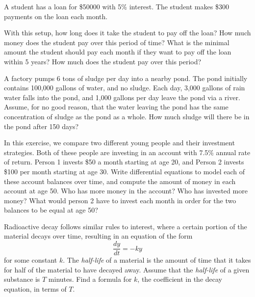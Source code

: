 \begin{exercise}
A student has a loan for \$50000 with 5\% interest. The student makes \$300 payments on the loan each month. 
\begin{tasks}
\task With this setup, how long does it take the student to pay off the loan? How much money does the student pay over this period of time?
\task What is the minimal amount the student should pay each month if they want to pay off the loan within 5 years? How much does the student pay over this period?
\end{tasks}
\end{exercise}

\begin{exercise}
A factory pumps 6 tons of sludge per day into a nearby pond. The pond initially contains 100,000 gallons of water, and no sludge. Each day, 3,000 gallons of rain water falls into the pond, and 1,000 gallons per day leave the pond via a river. Assume, for no good reason, that the water leaving the pond has the same concentration of sludge as the pond as a whole. How much sludge will there be in the pond after 150 days? %
\end{exercise}

\begin{exercise}
In this exercise, we compare two different young people and their investment strategies. Both of these people are investing in an account with 7.5\% annual rate of return. Person 1 invests \$50 a month starting at age 20, and Person 2 invests \$100 per month starting at age 30. Write differential equations to model each of these account balances over time, and compute the amount of money in each account at age 50. Who has more money in the account? Who has invested more money? What would person 2 have to invest each month in order for the two balances to be equal at age 50?
\end{exercise}

\begin{exercise}
Radioactive decay follows similar rules to interest, where a certain portion of the material decays over time, resulting in an equation of the form 
\[ \frac{dy}{dt} = -ky \] for some constant $k$. The \emph{half-life} of a material is the amount of time that it takes for half of the material to have decayed away. Assume that the \emph{half-life} of a given substance is $T$ minutes. Find a formula for $k$, the coefficient in the decay equation, in terms of $T$.
\end{exercise}


